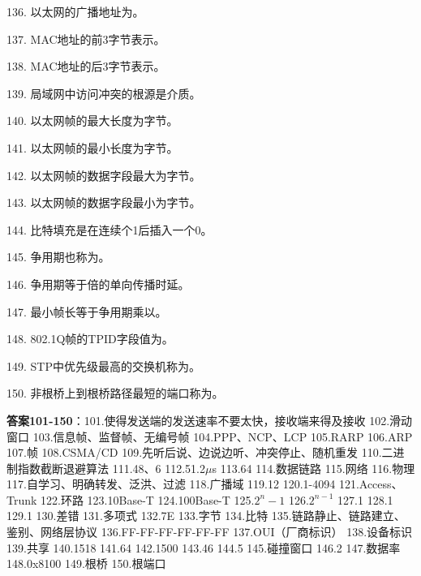 136. 以太网的广播地址为\underline{\hspace{4cm}}。

137. MAC地址的前3字节表示\underline{\hspace{2cm}}。

138. MAC地址的后3字节表示\underline{\hspace{2cm}}。

139. 局域网中访问冲突的根源是\underline{\hspace{2cm}}介质。

140. 以太网帧的最大长度为\underline{\hspace{2cm}}字节。

141. 以太网帧的最小长度为\underline{\hspace{2cm}}字节。

142. 以太网帧的数据字段最大为\underline{\hspace{2cm}}字节。

143. 以太网帧的数据字段最小为\underline{\hspace{2cm}}字节。

144. 比特填充是在连续\underline{\hspace{2cm}}个1后插入一个0。

145. 争用期也称为\underline{\hspace{2cm}}。

146. 争用期等于\underline{\hspace{2cm}}倍的单向传播时延。

147. 最小帧长等于争用期乘以\underline{\hspace{2cm}}。

148. 802.1Q帧的TPID字段值为\underline{\hspace{2cm}}。

149. STP中优先级最高的交换机称为\underline{\hspace{2cm}}。

150. 非根桥上到根桥路径最短的端口称为\underline{\hspace{2cm}}。

\textbf{答案101-150}：101.使得发送端的发送速率不要太快，接收端来得及接收 102.滑动窗口 103.信息帧、监督帧、无编号帧 104.PPP、NCP、LCP 105.RARP 106.ARP 107.帧 108.CSMA/CD 109.先听后说、边说边听、冲突停止、随机重发 110.二进制指数截断退避算法 111.48、6 112.51.2$\mu$s 113.64 114.数据链路 115.网络 116.物理 117.自学习、明确转发、泛洪、过滤 118.广播域 119.12 120.1-4094 121.Access、Trunk 122.环路 123.10Base-T 124.100Base-T 125.$2^n-1$ 126.$2^{n-1}$ 127.1 128.1 129.1 130.差错 131.多项式 132.7E 133.字节 134.比特 135.链路静止、链路建立、鉴别、网络层协议 136.FF-FF-FF-FF-FF-FF 137.OUI（厂商标识） 138.设备标识 139.共享 140.1518 141.64 142.1500 143.46 144.5 145.碰撞窗口 146.2 147.数据率 148.0x8100 149.根桥 150.根端口


